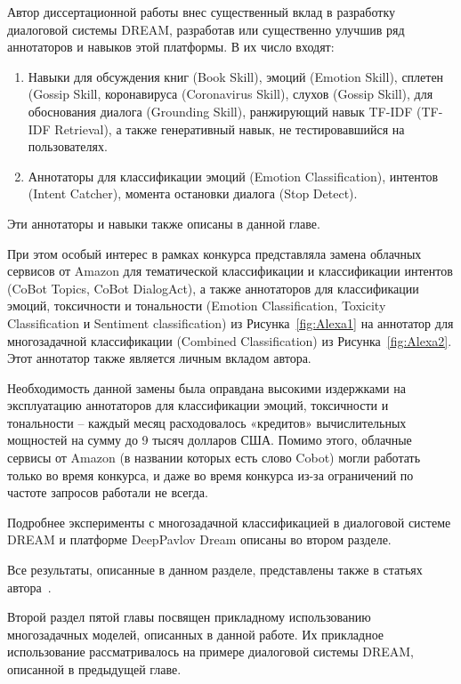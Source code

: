 Автор диссертационной работы внес существенный вклад в разработку диалоговой системы DREAM, разработав или существенно улучшив ряд аннотаторов и навыков этой платформы. В их число входят:
\begin{enumerate}
 \item Навыки для обсуждения книг (Book Skill), эмоций (Emotion Skill), сплетен (Gossip Skill, коронавируса (Coronavirus Skill), слухов (Gossip Skill), для обоснования диалога (Grounding Skill), ранжирующий навык TF-IDF (TF-IDF Retrieval), а также генеративный навык, не тестировавшийся на пользователях.
 \item Аннотаторы для классификации эмоций (Emotion Classification), интентов (Intent Catcher), момента остановки диалога (Stop Detect).
\end{enumerate}

Эти аннотаторы и навыки также описаны в данной главе. 

При этом особый интерес в рамках конкурса представляла замена облачных сервисов от Amazon для тематической классификации и классификации интентов (CoBot Topics, CoBot DialogAct), а также аннотаторов для классификации эмоций, токсичности и тональности (Emotion Classification, Toxicity Classification и Sentiment classification) из Рисунка~\ref{fig:Alexa1} на аннотатор для многозадачной классификации (Combined Classification) из Рисунка~\ref{fig:Alexa2}. Этот аннотатор также является личным вкладом автора.

Необходимость данной замены была оправдана высокими издержками на эксплуатацию аннотаторов для классификации эмоций, токсичности и тональности -- каждый месяц расходовалось «кредитов» вычислительных мощностей на сумму до 9 тысяч долларов США. Помимо этого, облачные сервисы от Amazon (в названии которых есть слово Cobot) могли работать только во время конкурса, и даже во время конкурса из-за ограничений по частоте запросов работали не всегда.

Подробнее эксперименты с многозадачной классификацией в диалоговой системе DREAM и платформе DeepPavlov Dream описаны во втором разделе.

Все результаты, описанные в данном разделе, представлены также в статьях автора~\cite{dream1,dream1_trudy,dream2}.

Второй раздел пятой главы посвящен прикладному использованию многозадачных моделей, описанных в данной работе. Их прикладное использование рассматривалось на примере диалоговой системы DREAM, описанной в предыдущей главе.

